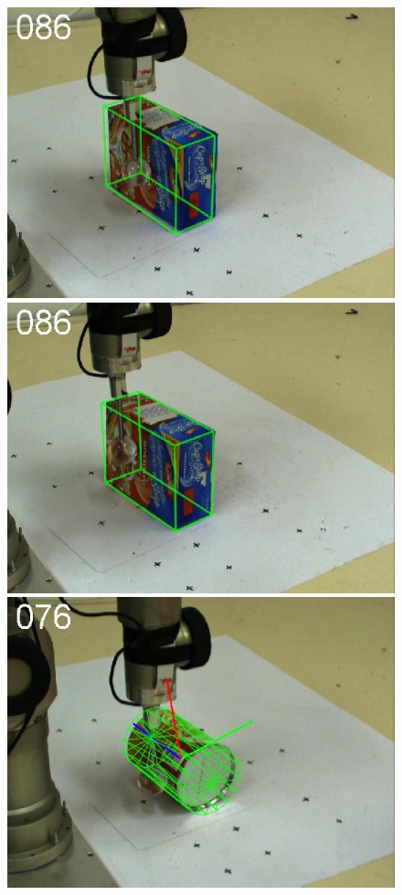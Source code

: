 \begin{figure}[htbp]
{\includegraphics[width=\imgAXwid]{./A2_2exp_87_1}
\includegraphics[width=\imgAXwid]{./A2_LWPR1_399_1}
\includegraphics[width=\imgAXwid]{./A3_2exp_39_1}
}
\end{figure}
